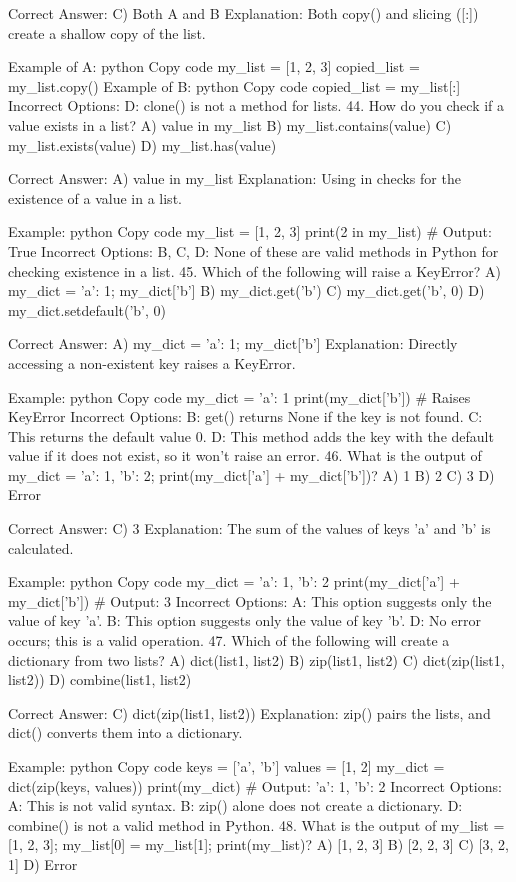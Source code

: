 Correct Answer: C) Both A and B
Explanation: Both copy() and slicing ([:]) create a shallow copy of the list.

Example of A:
python
Copy code
my_list = [1, 2, 3]
copied_list = my_list.copy()
Example of B:
python
Copy code
copied_list = my_list[:]
Incorrect Options:
D: clone() is not a method for lists.
44. How do you check if a value exists in a list?
A) value in my_list
B) my_list.contains(value)
C) my_list.exists(value)
D) my_list.has(value)

Correct Answer: A) value in my_list
Explanation: Using in checks for the existence of a value in a list.

Example:
python
Copy code
my_list = [1, 2, 3]
print(2 in my_list)  # Output: True
Incorrect Options:
B, C, D: None of these are valid methods in Python for checking existence in a list.
45. Which of the following will raise a KeyError?
A) my_dict = {'a': 1}; my_dict['b']
B) my_dict.get('b')
C) my_dict.get('b', 0)
D) my_dict.setdefault('b', 0)

Correct Answer: A) my_dict = {'a': 1}; my_dict['b']
Explanation: Directly accessing a non-existent key raises a KeyError.

Example:
python
Copy code
my_dict = {'a': 1}
print(my_dict['b'])  # Raises KeyError
Incorrect Options:
B: get() returns None if the key is not found.
C: This returns the default value 0.
D: This method adds the key with the default value if it does not exist, so it won't raise an error.
46. What is the output of my_dict = {'a': 1, 'b': 2}; print(my_dict['a'] + my_dict['b'])?
A) 1
B) 2
C) 3
D) Error

Correct Answer: C) 3
Explanation: The sum of the values of keys 'a' and 'b' is calculated.

Example:
python
Copy code
my_dict = {'a': 1, 'b': 2}
print(my_dict['a'] + my_dict['b'])  # Output: 3
Incorrect Options:
A: This option suggests only the value of key 'a'.
B: This option suggests only the value of key 'b'.
D: No error occurs; this is a valid operation.
47. Which of the following will create a dictionary from two lists?
A) dict(list1, list2)
B) zip(list1, list2)
C) dict(zip(list1, list2))
D) combine(list1, list2)

Correct Answer: C) dict(zip(list1, list2))
Explanation: zip() pairs the lists, and dict() converts them into a dictionary.

Example:
python
Copy code
keys = ['a', 'b']
values = [1, 2]
my_dict = dict(zip(keys, values))
print(my_dict)  # Output: {'a': 1, 'b': 2}
Incorrect Options:
A: This is not valid syntax.
B: zip() alone does not create a dictionary.
D: combine() is not a valid method in Python.
48. What is the output of my_list = [1, 2, 3]; my_list[0] = my_list[1]; print(my_list)?
A) [1, 2, 3]
B) [2, 2, 3]
C) [3, 2, 1]
D) Error

